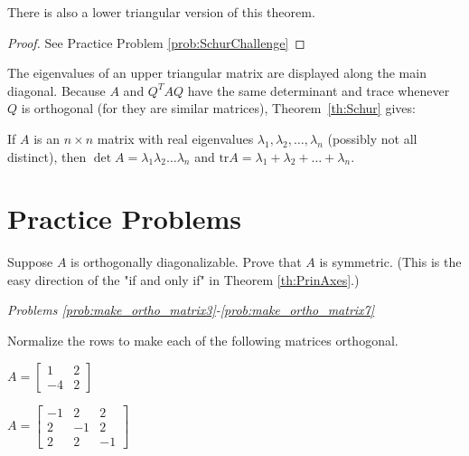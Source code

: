 \documentclass{ximera}
\begin{document}
\begin{remark}There is also a lower triangular version of this theorem.
\end{remark}

\begin{proof}
See Practice Problem \ref{prob:SchurChallenge}
\end{proof}

The eigenvalues of an upper triangular matrix are displayed along the main diagonal. Because $A$ and $Q^{T}AQ$ have the same determinant and trace whenever $Q$ is orthogonal (for they are similar matrices), Theorem~\ref{th:Schur} gives:

\begin{corollary}\label{cor:det_and_tr}
If $A$ is an $n \times n$ matrix with real eigenvalues $\lambda_{1}, \lambda_{2}, \dots, \lambda_{n}$ (possibly not all distinct), then $\det A = \lambda_{1}\lambda_{2} \dots \lambda_{n}$ and $\mbox{tr} A = \lambda_{1} + \lambda_{2} + \dots  + \lambda_{n}$.
\end{corollary}

\section*{Practice Problems}

\begin{problem}\label{prob:ortho_diag_implies_symmetric}
Suppose $A$ is orthogonally diagonalizable.  Prove that $A$ is symmetric.  (This is the easy direction of the "if and only if" in Theorem \ref{th:PrinAxes}.)
\end{problem}

\emph{Problems \ref{prob:make_ortho_matrix3}-\ref{prob:make_ortho_matrix7}}

Normalize the rows to make each of the following matrices orthogonal.


\begin{problem}\label{prob:make_ortho_matrix3}
$A = \begin{bmatrix}
1 & 2 \\
-4 & 2
\end{bmatrix}$
\end{problem}

\begin{problem}\label{prob:make_ortho_matrix7}
$A = \begin{bmatrix}
-1 & 2 & 2 \\
2 & -1 & 2 \\
2 & 2 & -1
\end{bmatrix}$
\end{problem}
\end{document}
